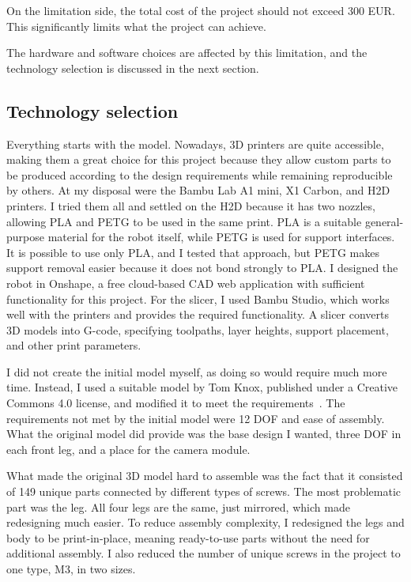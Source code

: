 \documentclass[a4paper,12pt]{report}
\begin{document}
On the limitation side, the total cost of the project should not exceed 300 EUR\@. This
significantly limits what the project can achieve.

The hardware and software choices are affected by this limitation, and the technology selection is
discussed in the next section.
\subsection{Technology selection}
\label{subsec:technology-selection}
Everything starts with the model. Nowadays, 3D printers are quite accessible, making them a great
choice for this project because they allow custom parts to be produced according to the design
requirements while remaining reproducible by others. At my disposal were the Bambu Lab A1 mini,
X1 Carbon, and H2D printers. I tried them all and settled on the H2D because it has two nozzles,
allowing PLA and PETG to be used in the same print. PLA is a suitable general-purpose material for
the robot itself, while PETG is used for support interfaces. It is possible to use only PLA, and I
tested that approach, but PETG makes support removal easier because it does not bond strongly to
PLA\@. I designed the robot in Onshape, a free cloud-based CAD web application with sufficient
functionality for this project. For the slicer, I used Bambu Studio, which works well with the
printers and provides the required functionality. A slicer converts 3D models into G-code,
specifying toolpaths, layer heights, support placement, and other print parameters.

I did not create the initial model myself, as doing so would require much more time. Instead, I
used a suitable model by Tom Knox, published under a Creative Commons 4.0 license, and modified it
to meet the requirements~\parencite{knox}. The requirements not met by the initial model were 12 DOF
and ease of assembly. What the original model did provide was the base design I wanted, three DOF
in each front leg, and a place for the camera module.

What made the original 3D model hard to assemble was the fact that it consisted of 149 unique parts
connected by different types of screws. The most problematic part was the leg. All four legs are
the same, just mirrored, which made redesigning much easier. To reduce assembly complexity, I
redesigned the legs and body to be print-in-place, meaning ready-to-use parts without the need for
additional assembly. I also reduced the number of unique screws in the project to one type, M3, in
two sizes.
\end{document}
